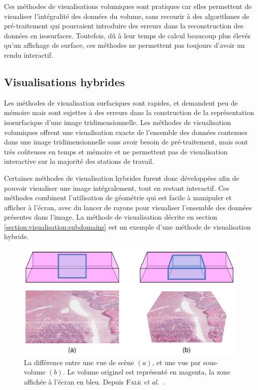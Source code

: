 {{{            Ces méthodes de visualisations volumiques sont pratiques car elles permettent de visualiser l'intégralité des données du volume, sans recourir à des algorithmes de pré-traitement qui pourraient introduire des erreurs dans la reconstruction des données en isosurfaces. Toutefois, dû à leur temps de calcul beaucoup plus élevés qu'un affichage de surface, ces méthodes ne permettent pas toujours d'avoir un rendu interactif.
        }
        
        \subsection{Visualisations hybrides}
        {
            Les méthodes de visualisation surfaciques sont rapides, et demandent peu de mémoire mais sont sujettes à des erreurs dans la construction de la représentation isosurfacique d'une image tridimensionnelle. Les méthodes de visualisation volumiques offrent une visualisation exacte de l'ensemble des données contenues dans une image tridimensionnelle sans avoir besoin de pré-traitement, mais sont très coûteuses en temps et mémoire et ne permettent pas de visualisation interactive sur la majorité des stations de travail.

            Certaines méthodes de visualisation hybrides furent donc développées afin de pouvoir visualiser une image intégralement, tout en restant interactif. Ces méthodes combinent l'utilisation de géométrie qui est facile à manipuler et afficher à l'écran, avec du lancer de rayons pour visualiser l'ensemble des données présentes dans l'image. La méthode de visualisation décrite en section \ref{section:visualisation:subdomains} est un exemple d'une méthode de visualisation hybride.

            \begin{figure}[h]
                \centering
                \includegraphics[width=.9\linewidth]{img/falk_et_al.png}
                \captionsetup{width=.8\linewidth}
                \caption{La différence entre une vue de scène $(a)$, et une vue par sous-volume $(b)$. Le volume originel est représenté en magenta, la zone affichée à l'écran en bleu. Depuis \textsc{Falk} \textit{et al.}~\cite{cite_3d_real_time_histopathology}.}
                \label{img:visualisation:falk}
            \end{figure}

}}}

